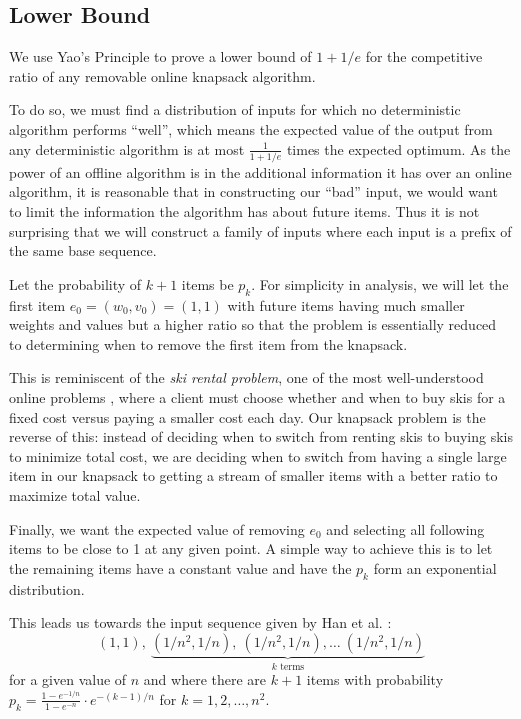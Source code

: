 \subsection{Lower Bound}
We use Yao's Principle to prove a lower bound of $1+1/e$ for the competitive ratio of any removable online knapsack algorithm.

To do so, we must find a distribution of inputs for which no deterministic algorithm performs ``well'', which means the expected value of the output from any deterministic algorithm is at most $\frac{1}{1+1/e}$ times the expected optimum. As the power of an offline algorithm is in the additional information it has over an online algorithm, it is reasonable that in constructing our ``bad'' input, we would want to limit the information the algorithm has about future items. Thus it is not surprising that we will construct a family of inputs where each input is a prefix of the same base sequence.

Let the probability of $k+1$ items be $p_k$. For simplicity in analysis, we will let the first item $e_0=(w_0,v_0)=(1,1)$ with future items having much smaller weights and values but a higher ratio so that the problem is essentially reduced to determining when to remove the first item from the knapsack.

This is reminiscent of the \emph{ski rental problem}, one of the most well-understood online problems \cite{karlin}, where a client must choose whether and when to buy skis for a fixed cost versus paying a smaller cost each day. Our knapsack problem is the reverse of this: instead of deciding when to switch from renting skis to buying skis to minimize total cost, we are deciding when to switch from having a single large item in our knapsack to getting a stream of smaller items with a better ratio to maximize total value.

Finally, we want the expected value of removing $e_0$ and selecting all following items to be close to 1 at any given point. A simple way to achieve this is to let the remaining items have a constant value and have the $p_k$ form an exponential distribution.

This leads us towards the input sequence given by Han et al. \cite{han}:
\begin{equation}
	\label{eq:knapsack_dist}
	(1,1),\ \underbrace{(1/n^2,1/n),\ (1/n^2,1/n),\ldots\ (1/n^2,1/n)}_{k \text{ terms}}
\end{equation}
for a given value of $n$ and where there are $k+1$ items with probability $p_k = \frac{1-e^{-1/n}}{1-e^{-n}} \cdot e^{-(k-1)/n}$ for $k=1,2,\ldots,n^2$.

